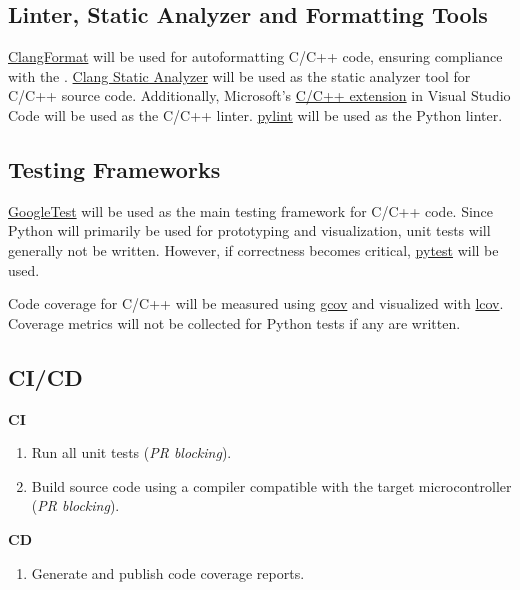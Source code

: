 \documentclass{article}
\begin{document}
\subsection{Linter, Static Analyzer and Formatting Tools}

\href{https://clang.llvm.org/docs/ClangFormat.html}{ClangFormat} will be used
for autoformatting C/C++ code, ensuring compliance with the
.
\href{https://clang-analyzer.llvm.org/}{Clang Static Analyzer} will be used as
the static analyzer tool for C/C++ source code.
Additionally, Microsoft’s
\href{https://code.visualstudio.com/docs/languages/cpp}{C/C++ extension} in
Visual Studio Code will be used as the C/C++ linter.
\href{https://pypi.org/project/pylint/}{pylint} will be used as the Python
linter.

\subsection{Testing Frameworks}
\href{https://github.com/google/googletest}{GoogleTest} will be used as the main
testing framework for C/C++ code. Since Python will primarily be used for
prototyping and visualization, unit tests will generally not be written.
However, if correctness becomes critical,
\href{https://docs.pytest.org/}{pytest} will be used.

Code coverage for C/C++ will be measured using
\href{https://gcc.gnu.org/onlinedocs/gcc/Gcov.html}{gcov} and visualized with
\href{https://wiki.documentfoundation.org/Development/Lcov}{lcov}. Coverage
metrics will not be collected for Python tests if any are written.

\subsection{CI/CD}

\textbf{CI}
\begin{enumerate}
  \item Run all unit tests (\textit{PR blocking}).
  \item Build source code using a compiler compatible with the target
  microcontroller (\textit{PR blocking}).
\end{enumerate}
\textbf{CD} %
\begin{enumerate}
    \item Generate and publish code coverage reports.
\end{enumerate}
\end{document}
